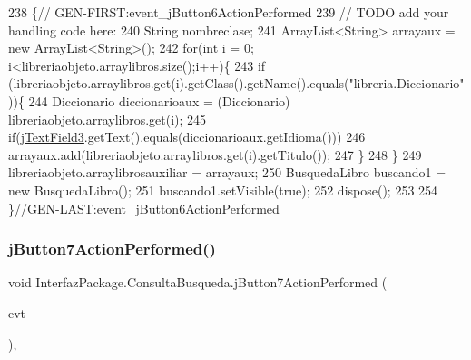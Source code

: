 \begin{DoxyCode}
238                                                                          \{\textcolor{comment}{//
      GEN-FIRST:event\_jButton6ActionPerformed}
239         \textcolor{comment}{// TODO add your handling code here:}
240         String nombreclase;
241         ArrayList<String> arrayaux = \textcolor{keyword}{new} ArrayList<String>();
242         \textcolor{keywordflow}{for}(\textcolor{keywordtype}{int} i = 0; i<libreriaobjeto.arraylibros.size();i++)\{
243             \textcolor{keywordflow}{if} (libreriaobjeto.arraylibros.get(i).getClass().getName().equals(\textcolor{stringliteral}{"libreria.Diccionario"}))\{
244                 Diccionario diccionarioaux = (Diccionario) libreriaobjeto.arraylibros.get(i);
245                 \textcolor{keywordflow}{if}(\mbox{\hyperlink{class_interfaz_package_1_1_consulta_busqueda_a1898d78ec07cfb8e5e74b50bce3e6239}{jTextField3}}.getText().equals(diccionarioaux.getIdioma()))
246                 arrayaux.add(libreriaobjeto.arraylibros.get(i).getTitulo());
247             \}
248         \}
249         libreriaobjeto.arraylibrosauxiliar = arrayaux;
250         BusquedaLibro buscando1 = \textcolor{keyword}{new} BusquedaLibro();
251         buscando1.setVisible(\textcolor{keyword}{true});
252         dispose();
253         
254     \}\textcolor{comment}{//GEN-LAST:event\_jButton6ActionPerformed}
\end{DoxyCode}
\mbox{\label{class_interfaz_package_1_1_consulta_busqueda_a390264bada5866106e6de1fc262ca5b7}} 
\subsubsection{\texorpdfstring{j\+Button7\+Action\+Performed()}{jButton7ActionPerformed()}}
{\footnotesize\ttfamily void Interfaz\+Package.\+Consulta\+Busqueda.\+j\+Button7\+Action\+Performed (\begin{DoxyParamCaption}\item[{java.\+awt.\+event.\+Action\+Event}]{evt }\end{DoxyParamCaption})\hspace{0.3cm}{\ttfamily [inline]}, {\ttfamily [private]}}


